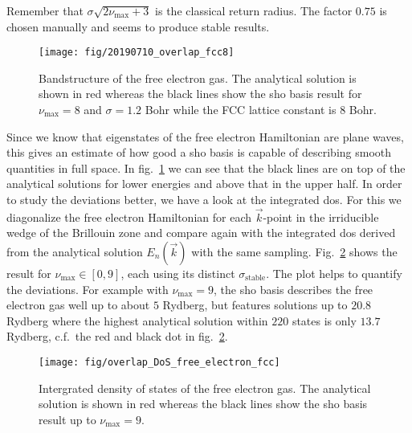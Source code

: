 \documentclass[oribibl]{llncs}
\newcommand{\um}[1]{_{\mathrm{#1}}}
\begin{document}
Remember that $\sigma \sqrt{2 \nu\um{max} + 3}$ is the classical return radius.
The factor $0.75$ is chosen manually and seems to produce stable results.
%
\begin{figure}
  \begin{minipage}[c]{.990\textwidth}
	\texttt{[image: fig/20190710\_overlap\_fcc8]} %
  \end{minipage}\hfill
  \begin{minipage}[c]{.009\textwidth}
  \end{minipage}
  \label{fig:overlap_fcc8}
  \caption{
	Bandstructure of the free electron gas. The analytical solution is shown in red
	whereas the black lines show the \ac{sho} basis result for $\nu\um{max} = 8$ and $\sigma = 1.2$ Bohr 
	while the FCC lattice constant is $8$ Bohr.
  }
\end{figure}
%
%
Since we know that eigenstates of the free electron Hamiltonian are plane waves,
this gives an estimate of how good a \ac{sho} basis is capable of describing
smooth quantities in full space. 
In fig.~\ref{fig:overlap_fcc8} we can see that the black lines are on top of the 
analytical solutions for lower energies and above that in the upper half.
In order to study the deviations better,
we have a look at the integrated \ac{dos}.
For this we diagonalize the free electron Hamiltonian for each $\vec k$-point
in the irriducible wedge of the Brillouin zone
and compare again with the integrated \ac{dos} derived from the analytical solution $E_n(\vec k)$
with the same sampling.
Fig.~\ref{fig:overlap_DoS_free_electron_fcc} shows the result for $\nu\um{max} \in [0, 9]$,
each using its distinct $\sigma\um{stable}$.
The plot helps to quantify the deviations. For example with $\nu\um{max} = 9$, the \ac{sho}
basis describes the free electron gas well up to about $5$ Rydberg, 
but features solutions up to $20.8$ Rydberg where the highest analytical solution
within $220$ states is only $13.7$ Rydberg,
c.f.~the red and black dot in fig.~\ref{fig:overlap_DoS_free_electron_fcc}.
%
\begin{figure}
  \begin{minipage}[c]{.990\textwidth}
	\texttt{[image: fig/overlap\_DoS\_free\_electron\_fcc]} %
  \end{minipage}\hfill
  \begin{minipage}[c]{.009\textwidth}
  \end{minipage}
  \label{fig:overlap_DoS_free_electron_fcc}
  \caption{
	Intergrated density of states of the free electron gas. The analytical solution is shown in red
	whereas the black lines show the \ac{sho} basis result up to $\nu\um{max} = 9$.
  }
\end{figure}
%
%
\end{document}
